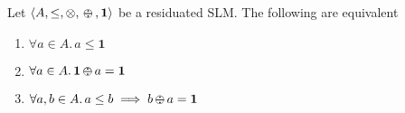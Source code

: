 \documentclass{llncs}
\def\1{{\mathbf 1}}
\newcommand{\comment}[1]{}
\newcommand{\shortNoProof}[1]{ }
\def\monid{{\mathbf 0}}
\def\1{{\mathbf 1}}
\def\monop{\otimes}
\def\odiv{\, {\ominus\hspace{-7.7pt} \div} \,}
\def\monid{\mathbf{1}}
\begin{document}
\comment{
%
Distributivity holds also for the empty set and for infinite sets, if the necessary LUBs exist.
%
Instead, it holds only partially for $\odiv$: this follows directly from the monotonicity of $\odiv$ on the first argument, 
since it implies that $x \odiv a \leq \bigvee X \odiv a$ for all $x \in X$.

\begin{lemma}
	\label{distodiv}
	Let $\langle A, \leq, \monop, \odiv, \monid \rangle$ be an ReSL and $X \subseteq A$ a finite non-empty set. Then 
	\begin{itemize}
		\item $\forall a \in A.\, \bigvee \{ x \odiv a \mid x \in X \} \leq \bigvee X \odiv a$
	\end{itemize}	
\end{lemma}

\shortNoProof{
\begin{proof}
Straightforward, since by the monotonicity of $\odiv$ in the first argument (Lemma~\ref{mono}) we get
 $\forall x \in X.\,x \odiv a \leq \bigvee X \odiv a$, which implies
 $\bigvee \{ x \odiv a \mid x \in X\} \leq \bigvee X \odiv a$.
\qed
\end{proof}
}

Also this inequation holds for the empty set and for infinite sets, if the necessary LUBs exist.
%
Moreover, it also holds that $\bigvee \{ a \odiv x \mid x \in X \} \geq a \odiv \bigvee X$, since $\odiv$ is anti-monotone on the second argument.
}

\begin{proposition}\label{reabs}
	Let $\langle A, \leq, \monop, \odiv, \monid \rangle$ be a residuated SLM. The following are equivalent
	\begin{enumerate}
		\item $\forall a \in A.\, a \leq \1$
		\item $\forall a \in A.\, \1 \odiv a = \1$		
		\item $\forall a, b \in A.\, a \leq b \implies b \odiv a = \1$
	\end{enumerate}	
\end{proposition}
\end{document}
